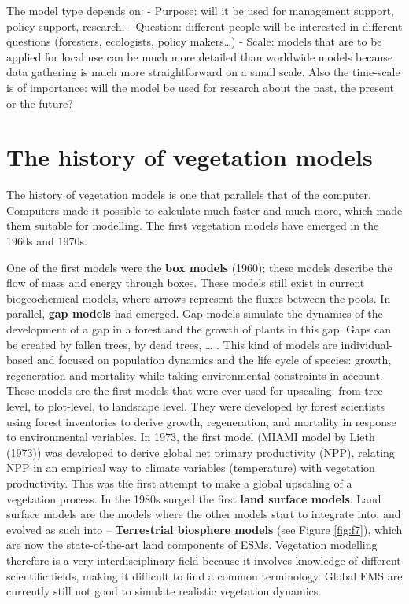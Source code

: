 \documentclass[12pt,oneside]{book}
\begin{document}
The model type depends on: - Purpose: will it be used for management
support, policy support, research. - Question: different people will be
interested in different questions (foresters, ecologists, policy
makers\ldots{}) - Scale: models that are to be applied for local use can
be much more detailed than worldwide models because data gathering is
much more straightforward on a small scale. Also the time-scale is of
importance: will the model be used for research about the past, the
present or the future?

\section{The history of vegetation
models}\label{the-history-of-vegetation-models}

The history of vegetation models is one that parallels that of the
computer. Computers made it possible to calculate much faster and much
more, which made them suitable for modelling. The first vegetation
models have emerged in the 1960s and 1970s.

One of the first models were the \textbf{box models} (1960); these
models describe the flow of mass and energy through boxes. These models
still exist in current biogeochemical models, where arrows represent the
fluxes between the pools. In parallel, \textbf{gap models} had emerged.
Gap models simulate the dynamics of the development of a gap in a forest
and the growth of plants in this gap. Gaps can be created by fallen
trees, by dead trees, \ldots{} . This kind of models are
individual-based and focused on population dynamics and the life cycle
of species: growth, regeneration and mortality while taking
environmental constraints in account. These models are the first models
that were ever used for upscaling: from tree level, to plot-level, to
landscape level. They were developed by forest scientists using forest
inventories to derive growth, regeneration, and mortality in response to
environmental variables. In 1973, the first model (MIAMI model by Lieth
(1973)) was developed to derive global net primary productivity (NPP),
relating NPP in an empirical way to climate variables (temperature) with
vegetation productivity. This was the first attempt to make a global
upscaling of a vegetation process. In the 1980s surged the first
\textbf{land surface models}. Land surface models are the models where
the other models start to integrate into, and evolved as such into --
\textbf{Terrestrial biosphere models} (see Figure \ref{fig:f7}), which
are now the state-of-the-art land components of ESMs. Vegetation
modelling therefore is a very interdisciplinary field because it
involves knowledge of different scientific fields, making it difficult
to find a common terminology. Global EMS are currently still not good to
simulate realistic vegetation dynamics.
\end{document}
